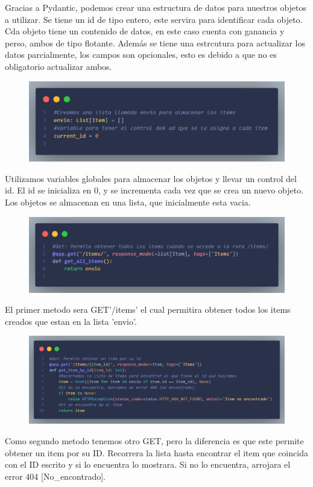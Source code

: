 \documentclass[12pt]{article}
\begin{document}
Gracias a Pydantic, podemos crear una estructura de datos para nuestros objetos a utilizar.
Se tiene un id de tipo entero, este servira para identificar cada objeto.
Cda objeto tiene un contenido de datos, en este caso cuenta con ganancia y perso, ambos de tipo flotante.
Además se tiene una estrcutura para actualizar los datos parcialmente, los campos son opcionales, esto es debido a que no es obligatorio actualizar ambos.

\begin{figure}[H]
    \centering
    \includegraphics[width=1\textwidth]{Imagenes/Captura4_variablesGlobales.png}
\end{figure}

Utilizamos variables globales para almacenar los objetos y llevar un control del id.
El id se inicializa en 0, y se incrementa cada vez que se crea un nuevo objeto.
Los objetos se almacenan en una lista, que inicialmente esta vacia.\\

\begin{figure}[H]
    \centering
    \includegraphics[width=1\textwidth]{Imagenes/Captura5_getAll.png}
\end{figure}
El primer metodo sera GET{'/items'} el cual permitira obtener todos los items creados que estan en la lista 'envio'.

\begin{figure}[H]
    \centering
    \includegraphics[width=1\textwidth]{Imagenes/Captura6_getindividual.png}
\end{figure}
Como segundo metodo tenemos otro GET, pero la diferencia es que este permite obtener un item por su ID.
Recorrera la lista hasta encontrar el item que coincida con el ID escrito y si lo encuentra lo mostrara.
Si no lo encuentra, arrojara el error 404 [No\_encontrado].
\end{document}
